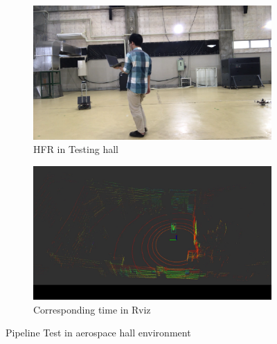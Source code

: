 \begin{figure}[!htb]
    \centering
    \begin{subfigure}{.5\linewidth}
        \centering
        \includegraphics[width=0.95\linewidth,height = 0.5\linewidth]{figures/chap4_fig/Results/Hall/real_hall.png}
          \caption{HFR in Testing hall}
        \label{chap4:fig21:sub1}
    \end{subfigure}%
    \begin{subfigure}{.5\linewidth}
        \centering
        \includegraphics[width=0.95\linewidth,height = 0.5\linewidth]{figures/chap4_fig/Results/Hall/rviz_hall.png}
          \caption{Corresponding time in Rviz}
        \label{Chap4:fig21:sub2}
    \end{subfigure}
    \caption{Pipeline Test in aerospace hall environment}
    \label{Chap4:fig21}
\end{figure}


